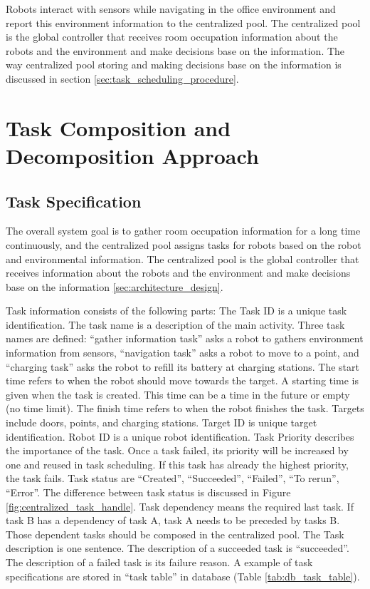 Robots interact with sensors while navigating in the office environment and report this environment information to the centralized pool. The centralized pool is the global controller that receives room occupation information about the robots and the environment and make decisions base on the information.  The way centralized pool storing and making decisions base on the information is discussed in section \ref{sec:task_scheduling_procedure}.

\section{Task Composition and Decomposition Approach}
\label{sec:task_explan}

\subsection{Task Specification}

The overall system goal is to gather room occupation information for a long time continuously, and the centralized pool assigns tasks for robots based on the robot and environmental information. The centralized pool is the global controller that receives information about the robots and the environment and make decisions base on the information \ref{sec:architecture_design}. 

Task information consists of the following parts: The Task ID is a unique task identification. The task name is a description of the main activity.
Three task names are defined: ``gather information task'' asks a robot to gathers environment information from sensors, ``navigation task'' asks a robot to move to a point, and ``charging task'' asks the robot to refill its battery at charging stations. The start time refers to when the robot should move towards the target. A starting time is given when the task is created. This time can be a time in the future or empty (no time limit). The finish time refers to when the robot finishes the task. Targets include doors, points, and charging stations. Target ID is unique target identification. Robot ID is a unique robot identification. Task Priority describes the importance of the task. Once a task failed, its priority will be increased by one and reused in task scheduling. If this task has already the highest priority, the task fails. Task status are ``Created'', ``Succeeded'', ``Failed'', ``To rerun'', ``Error''. The difference between task status is discussed in Figure \ref{fig:centralized_task_handle}. Task dependency means the required last task. If task B has a dependency of task A, task A needs to be preceded by tasks B. Those dependent tasks should be composed in the centralized pool. The Task description is one sentence. The description of a succeeded task is ``succeeded''. The description of a failed task is its failure reason. A example of  task specifications are stored in ``task table'' in database (Table \ref{tab:db_task_table}).





